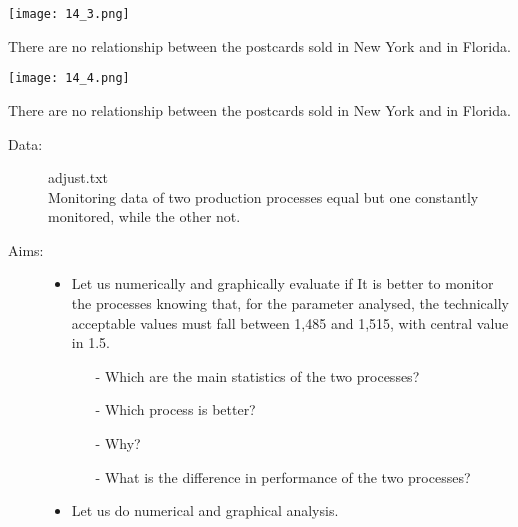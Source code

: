 \begin{frame}
	\begin{center}
		\texttt{[image: 14\_3.png]}
	\end{center}
\begin{footnotesize}There are no relationship between the postcards sold in New York and in Florida.
\end{footnotesize}\end{frame}

\begin{frame} 
	\begin{center}
		\texttt{[image: 14\_4.png]}
	\end{center}
\begin{footnotesize}There are no relationship between the postcards sold in New York and in Florida.
\end{footnotesize}\end{frame}


\begin{frame} 
\begin{description}
	\item[Data:] adjust.txt\\
	Monitoring data of two production processes equal but one constantly monitored, while the other not.
	\item[Aims:] \begin{itemize}
				\item Let us numerically and graphically evaluate if It is better to monitor the processes knowing that, for the parameter analysed, the technically acceptable values must fall between 1,485 and 1,515, with central value in 1.5. 
				\begin{itemize}
					\item[-] Which are the main statistics of the two processes?
					\item[-] Which process is better? 
					\item[-] Why? 
					\item[-] What is the difference in performance of the two processes?
				\end{itemize}
				\item Let us do numerical and graphical analysis.
	                  \end{itemize}
\end{description}
\end{frame}


